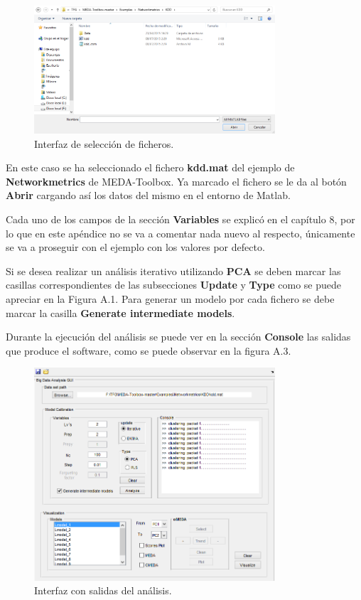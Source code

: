 \begin{figure}
\centering
\includegraphics[width=0.8\textwidth]{imagenes/figuras/MU-2.png}
\caption{Interfaz de selección de ficheros.}
\end{figure}

\bigskip

En este caso se ha seleccionado el fichero \textbf{kdd.mat} del ejemplo de \textbf{Networkmetrics} de MEDA-Toolbox. Ya marcado el fichero se le da al botón \textbf{Abrir} cargando así los datos del mismo en el entorno de Matlab.

\bigskip

Cada uno de los campos de la sección \textbf{Variables} se explicó en el capítulo 8, por lo que en este apéndice no se va a comentar nada nuevo al respecto, únicamente se va a proseguir con el ejemplo con los valores por defecto.

\bigskip

Si se desea realizar un análisis iterativo utilizando \textbf{PCA} se deben marcar las casillas correspondientes de las subsecciones \textbf{Update} y \textbf{Type} como se puede apreciar en la Figura A.1. Para generar un modelo por cada fichero se debe marcar la casilla \textbf{Generate intermediate models}.

\bigskip

Durante la ejecución del análisis se puede ver en la sección \textbf{Console} las salidas que produce el software, como se puede observar en la figura A.3.

\begin{figure}
\centering
\includegraphics[width=0.8\textwidth]{imagenes/figuras/MU-3.png}
\caption{Interfaz con salidas del análisis.}
\end{figure}

